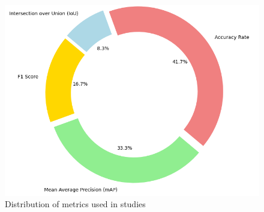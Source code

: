 \begin{figure}[h]
\begin{minipage}{0.5\textwidth}
        \includegraphics[width=\textwidth]{figs/metrics-distribution.png} %
        \caption{Distribution of metrics used in studies}
        \label{fig:metrics-distribution}
    \end{minipage}

\end{figure}